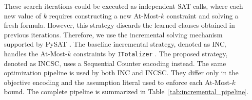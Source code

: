 \documentclass[letterpaper,journal]{IEEEtran}
\begin{document}
These search iterations could be executed as independent SAT calls, where each new value of $k$ requires constructing a new At-Most-$k$ constraint and solving a fresh formula. However, this strategy discards the learned clauses obtained in previous iterations. Therefore, we use the incremental solving mechanism supported by PySAT \cite{imms-sat18,itk-sat24}. The baseline incremental strategy, denoted as INC, handles the At-Most-$k$ constraints by \texttt{ITotalizer} \cite{martins2014incremental,Bailleux2003}. The proposed strategy, denoted as INCSC, uses a Sequential Counter encoding instead. The same optimization pipeline is used by both INC and INCSC. They differ only in the objective encoding and the assumption literal used to enforce each At-Most-$k$ bound. The complete pipeline is summarized in Table~\ref{tab:incremental_pipeline}.
\end{document}
